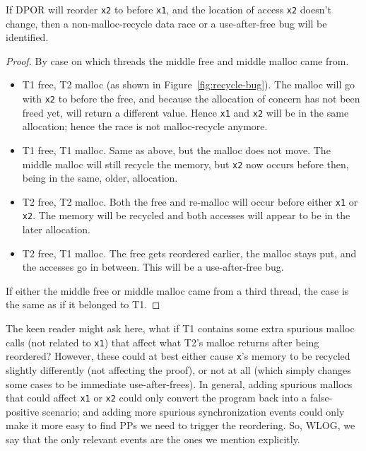 \begin{lemma}
	If DPOR will reorder {\tt x2} to before {\tt x1}, and the location of access {\tt x2} doesn't change,
	then a non-malloc-recycle data race or a use-after-free bug will be identified.
	\label{lem:reorder}
\end{lemma}
\begin{proof}
By case on which threads the middle free and middle malloc came from.
\begin{itemize}
	\item T1 free, T2 malloc (as shown in Figure~\ref{fig:recycle-bug}). The malloc will go with {\tt x2} to before the free, and because the allocation of concern has not been freed yet, will return a different value. Hence {\tt x1} and {\tt x2} will be in the same allocation; hence the race is not malloc-recycle anymore.
	\item T1 free, T1 malloc. Same as above, but the malloc does not move. The middle malloc will still recycle the memory, but {\tt x2} now occurs before then, being in the same, older, allocation.
	\item T2 free, T2 malloc. Both the free and re-malloc will occur before either {\tt x1} or {\tt x2}. The memory will be recycled and both accesses will appear to be in the later allocation.
	\item T2 free, T1 malloc. The free gets reordered earlier, the malloc stays put, and the accesses go in between. This will be a use-after-free bug.
\end{itemize}
If either the middle free or middle malloc came from a third thread, the case is the same as if it belonged to T1.
\end{proof}

The keen reader might ask here, what if T1 contains some extra spurious malloc calls (not related to {\tt x1}) that affect what T2's malloc returns after being reordered?
However, these could at best either cause {\tt x}'s memory to be recycled slightly differently (not affecting the proof), or not at all (which simply changes some cases to be immediate use-after-frees).
In general, adding spurious mallocs that could affect {\tt x1} or {\tt x2} could only convert the program back into a false-positive scenario;
and adding more spurious synchronization events could only make it more easy to find PPs we need to trigger the reordering.
So, WLOG, we say that the only relevant events are the ones we mention explicitly.

